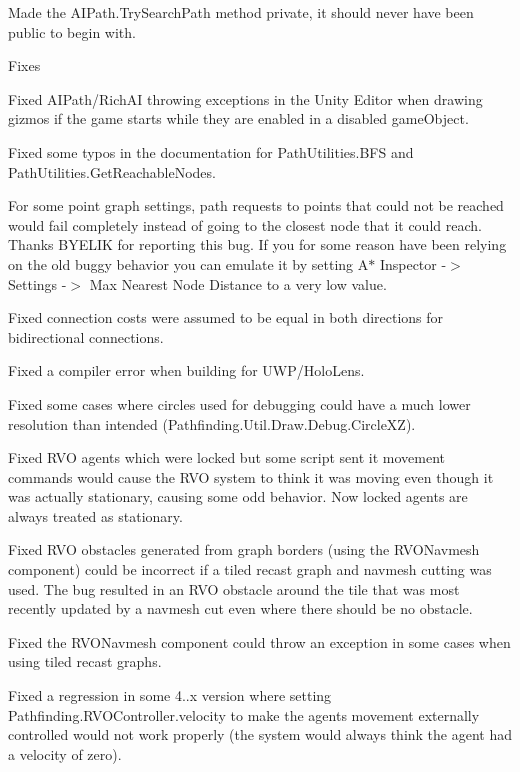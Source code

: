 \begin{DoxyItemize}
\begin{DoxyItemize}
\begin{DoxyItemize}
\item Made the A\+I\+Path.\+Try\+Search\+Path method private, it should never have been public to begin with.
\end{DoxyItemize}
\item Fixes
\begin{DoxyItemize}
\item Fixed A\+I\+Path/\+Rich\+AI throwing exceptions in the Unity Editor when drawing gizmos if the game starts while they are enabled in a disabled game\+Object.
\item Fixed some typos in the documentation for Path\+Utilities.\+B\+FS and Path\+Utilities.\+Get\+Reachable\+Nodes.
\item For some point graph settings, path requests to points that could not be reached would fail completely instead of going to the closest node that it could reach. Thanks B\+Y\+E\+L\+IK for reporting this bug. If you for some reason have been relying on the old buggy behavior you can emulate it by setting A$\ast$ Inspector -\/$>$ Settings -\/$>$ Max Nearest Node Distance to a very low value.
\item Fixed connection costs were assumed to be equal in both directions for bidirectional connections.
\item Fixed a compiler error when building for U\+W\+P/\+Holo\+Lens.
\item Fixed some cases where circles used for debugging could have a much lower resolution than intended (Pathfinding.\+Util.\+Draw.\+Debug.\+Circle\+X\+Z).
\item Fixed R\+VO agents which were locked but some script sent it movement commands would cause the R\+VO system to think it was moving even though it was actually stationary, causing some odd behavior. Now locked agents are always treated as stationary.
\item Fixed R\+VO obstacles generated from graph borders (using the R\+V\+O\+Navmesh component) could be incorrect if a tiled recast graph and navmesh cutting was used. The bug resulted in an R\+VO obstacle around the tile that was most recently updated by a navmesh cut even where there should be no obstacle.
\item Fixed the R\+V\+O\+Navmesh component could throw an exception in some cases when using tiled recast graphs.
\item Fixed a regression in some 4..\+x version where setting Pathfinding.\+R\+V\+O\+Controller.\+velocity to make the agent\textquotesingle{}s movement externally controlled would not work properly (the system would always think the agent had a velocity of zero).

\end{DoxyItemize}
\end{DoxyItemize}
\end{DoxyItemize}
